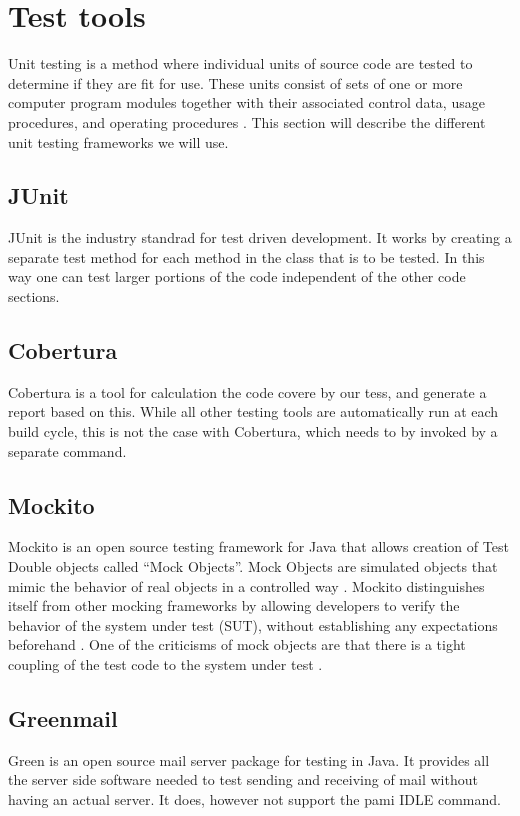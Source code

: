 \section{Test tools}
Unit testing is a method where individual units of source code are tested to determine if they are fit for use. These units consist of sets of one or more computer program modules together with their associated control data, usage procedures, and operating procedures \cite{bib:kolawa}. This section will describe the different unit testing frameworks we will use.

\subsection{JUnit}
JUnit is the industry standrad for test driven development. It works by creating a separate test method for each method in the class that is to be tested. In this way one can test larger portions of the code independent of the other code sections. \cite{bib:junit}

\subsection{Cobertura}
Cobertura is a tool for calculation the code covere by our tess, and generate a report based on this. While all other testing tools are automatically run at each build cycle, this is not the case with Cobertura, which needs to by invoked by a separate command.\cite{bib:cobertura}

\subsection{Mockito}
Mockito is an open source testing framework for Java that allows creation of Test Double objects called “Mock Objects”. Mock Objects are simulated objects that mimic the behavior of real objects in a controlled way \cite{bib:mock}.
\newline
\newline
Mockito distinguishes itself from other mocking frameworks by allowing developers to verify the behavior of the system under test (SUT), without establishing any expectations beforehand \cite{bib:mockito}.
One of the criticisms of mock objects are that there is a tight coupling of the test code to the system under test \cite{bib:mocks}.

\subsection{Greenmail}
Green is an open source mail server package for testing in Java. It provides all the server side software needed to test sending and receiving of mail without having an actual server. It does, however not support the \gls{pami} IDLE command.\cite{bib:greenmail}

